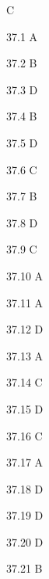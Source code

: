 \begin{Solution}{2}
C
\end{Solution}
\begin{Solution}{37.{1}}
A
\end{Solution}
\begin{Solution}{37.{2}}
B
\end{Solution}
\begin{Solution}{37.{3}}
D
\end{Solution}
\begin{Solution}{37.{4}}
B
\end{Solution}
\begin{Solution}{37.{5}}
D
\end{Solution}
\begin{Solution}{37.{6}}
C
\end{Solution}
\begin{Solution}{37.{7}}
B
\end{Solution}
\begin{Solution}{37.{8}}
D
\end{Solution}
\begin{Solution}{37.{9}}
C
\end{Solution}
\begin{Solution}{37.{10}}
A
\end{Solution}
\begin{Solution}{37.{11}}
A
\end{Solution}
\begin{Solution}{37.{12}}
D
\end{Solution}
\begin{Solution}{37.{13}}
A
\end{Solution}
\begin{Solution}{37.{14}}
C
\end{Solution}
\begin{Solution}{37.{15}}
D
\end{Solution}
\begin{Solution}{37.{16}}
C
\end{Solution}
\begin{Solution}{37.{17}}
A
\end{Solution}
\begin{Solution}{37.{18}}
D
\end{Solution}
\begin{Solution}{37.{19}}
D
\end{Solution}
\begin{Solution}{37.{20}}
D
\end{Solution}
\begin{Solution}{37.{21}}
B
\end{Solution}
